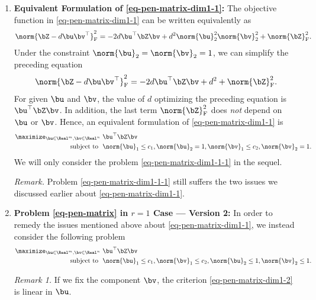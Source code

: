 \documentclass[12pt]{article}
\begin{document}
\begin{enumerate}[label=\textbf{\arabic*.}]
	\item \textbf{Equivalent Formulation of \eqref{eq-pen-matrix-dim1-1}:} The objective function in \eqref{eq-pen-matrix-dim1-1} can be written equivalently as 
	\begin{align*}
		\norm{\bZ - d \bu \bv^{\top}}_{\mathrm{F}}^2 = -2 d \bu^\top \bZ \bv + d^2 \norm{\bu}_2^2 \norm{\bv}_2^2 + \norm{\bZ}_{\mathrm{F}}^2. 
	\end{align*}
	Under the constraint $\norm{\bu}_2 = \norm{\bv}_2 = 1$, we can simplify the preceding equation 
	\begin{align*}
		\norm{\bZ - d \bu \bv^{\top}}_{\mathrm{F}}^2 = -2 d \bu^\top \bZ \bv + d^2 + \norm{\bZ}_{\mathrm{F}}^2. 
	\end{align*}
	For given $\bu$ and $\bv$, the value of $d$ optimizing the preceding equation is $\bu^\top \bZ \bv$. In addition, the last term $\norm{\bZ}_{\mathrm{F}}^2$ does \emph{not} depend on $\bu$ or $\bv$. Hence, an equivalent formulation of \eqref{eq-pen-matrix-dim1-1} is 
	\begin{equation}\label{eq-pen-matrix-dim1-1-1}
		\begin{aligned}
			\maximize_{\bu \in \Real^m, \bv \in \Real^n} & \ \bu^\top \bZ \bv \\ 
			\text{subject to } & \ \norm{\bu}_1 \le c_1, \norm{\bu}_2 = 1, \norm{\bv}_1 \le c_2, \norm{\bv}_2 = 1. 
		\end{aligned}
	\end{equation}
	We will only consider the problem \eqref{eq-pen-matrix-dim1-1-1} in the sequel. 
	
	\textit{Remark.} Problem \eqref{eq-pen-matrix-dim1-1-1} still suffers the two issues we discussed earlier about \eqref{eq-pen-matrix-dim1-1}. 
	
	\item \textbf{Problem \eqref{eq-pen-matrix} in $r=1$ Case --- Version 2:} In order to remedy the issues mentioned above about \eqref{eq-pen-matrix-dim1-1}, we instead consider the following problem 
	\begin{equation}\label{eq-pen-matrix-dim1-2}
		\begin{aligned}
			\maximize_{\bu \in \Real^m, \bv \in \Real^n} & \ \bu^\top \bZ \bv \\ 
			\text{subject to } & \ \norm{\bu}_1 \le c_1, \norm{\bv}_1 \le c_2, \norm{\bu}_2 \le 1, \norm{\bv}_2 \le 1. 
		\end{aligned}
	\end{equation}
	
	\textit{Remark 1.} If we fix the component $\bv$, the criterion \eqref{eq-pen-matrix-dim1-2} is linear in $\bu$. 
	

\end{enumerate}
\end{document}
